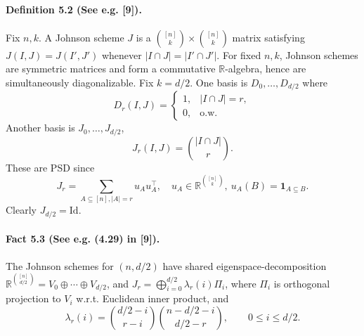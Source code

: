 \documentclass[10pt,a4paper]{article}
\begin{document}
\paragraph{Definition 5.2 (See e.g. [9]).} Fix $n,k$. A Johnson scheme $J$ is a $\binom{[n]}k\times\binom{[n]}k$ matrix satisfying $J(I,J)=J(I',J')$ whenever $|I\cap J|=|I'\cap J'|$. For fixed $n,k$, Johnson schemes are symmetric matrices and form a commutative $\mathbb R$-algebra, hence are simultaneously diagonalizable. Fix $k=d/2$. One basis is $D_0,\ldots,D_{d/2}$ where
\[D_r(I,J)=\begin{cases}1,&|I\cap J|=r,\\0,&\text{o.w.}\end{cases}\tag{5.3}\]
Another basis is $J_0,\ldots,J_{d/2}$,
\[J_r(I,J)=\binom{|I\cap J|}r.\tag{5.4}\]
These are PSD since
\[J_r=\sum_{A\subseteq[n],|A|=r}u_Au_A^\top,\quad u_A\in\mathbb R^{\binom{[n]}k},\ u_A(B)=\mathbf1_{A\subseteq B}.\tag{5.5}\]
Clearly $J_{d/2}=\mathrm{Id}$.
\paragraph{Fact 5.3 (See e.g. (4.29) in [9]).} The Johnson schemes for $(n,d/2)$ have shared eigenspace-decomposition $\mathbb R^{\binom{[n]}{d/2}}=V_0\oplus\cdots\oplus V_{d/2}$, and $J_r=\bigoplus_{i=0}^{d/2}\lambda_r(i)\Pi_i$, where $\Pi_i$ is orthogonal projection to $V_i$ w.r.t. Euclidean inner product, and
\[\lambda_r(i)=\binom{d/2-i}{r-i}\binom{n-d/2-i}{d/2-r},\qquad0\le i\le d/2.\]
\end{document}

